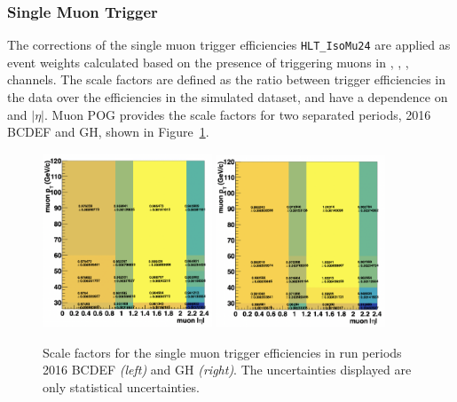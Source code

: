 \subsubsection{Single Muon Trigger}
The corrections of the single muon trigger efficiencies \texttt{HLT\_IsoMu24} are applied as event weights calculated based on the presence of triggering muons in \cme, \cmm, \cmt, \cmh channels. The scale factors are defined as the ratio between trigger efficiencies in the data over the efficiencies in the simulated dataset, and have a dependence on \pt and $|\eta|$. Muon POG provides the scale factors for two separated periods, 2016 BCDEF and GH, shown in Figure~\ref{fig:analysis:calibration:mu24TriggerSF}.
\begin{figure}
    \centering
    \includegraphics[width=0.45\textwidth]{chapters/Analysis/sectionCalibration/figures/trigger/muTrSF_BCDEF.png}
    \includegraphics[width=0.45\textwidth]{chapters/Analysis/sectionCalibration/figures/trigger/muTrSF_GH.png}
    \caption{Scale factors for the single muon trigger efficiencies in run periods 2016 BCDEF \emph{(left)} and GH \emph{(right)}. The uncertainties displayed are only statistical uncertainties.}
    \label{fig:analysis:calibration:mu24TriggerSF}
\end{figure}





